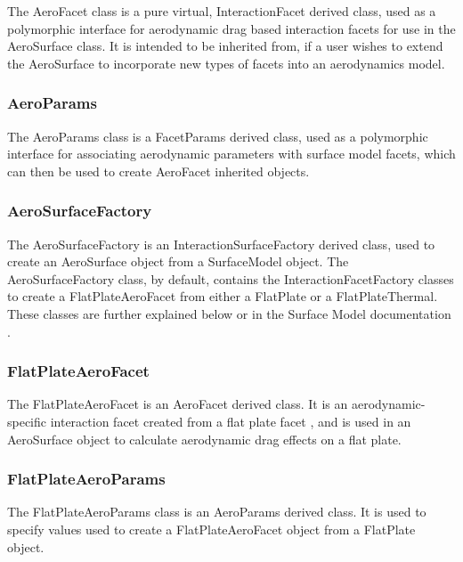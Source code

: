The AeroFacet class is a pure virtual, InteractionFacet \cite{dynenv:SURFACEMODEL} derived
class, used as a polymorphic interface for aerodynamic drag based interaction facets
for use in the AeroSurface class. It is intended to be inherited from, if a user wishes to
extend the AeroSurface to incorporate new types of facets into an aerodynamics model.

\subsubsection{AeroParams}

The AeroParams class is a FacetParams \cite{dynenv:SURFACEMODEL} derived class, used
as a polymorphic interface for associating aerodynamic parameters with surface model
facets, which can then be used to create AeroFacet inherited objects.

\subsubsection{AeroSurfaceFactory}

The AeroSurfaceFactory is an InteractionSurfaceFactory \cite{dynenv:SURFACEMODEL} derived
class, used to create an AeroSurface object from a SurfaceModel object. The AeroSurfaceFactory
class, by default, contains the InteractionFacetFactory classes to create a FlatPlateAeroFacet
from either a FlatPlate or a FlatPlateThermal. These classes are further explained
below or in the Surface Model documentation \cite{dynenv:SURFACEMODEL}.

\subsubsection{FlatPlateAeroFacet}

The FlatPlateAeroFacet is an AeroFacet derived class. It is an aerodynamic-specific interaction
facet created from a flat plate facet \cite{dynenv:SURFACEMODEL}, and is used in an
AeroSurface object to calculate aerodynamic drag effects on a flat plate.

\subsubsection{FlatPlateAeroParams}

The FlatPlateAeroParams class is an AeroParams derived class. It is used to specify values
used to create a FlatPlateAeroFacet object from a FlatPlate \cite{dynenv:SURFACEMODEL} object.

